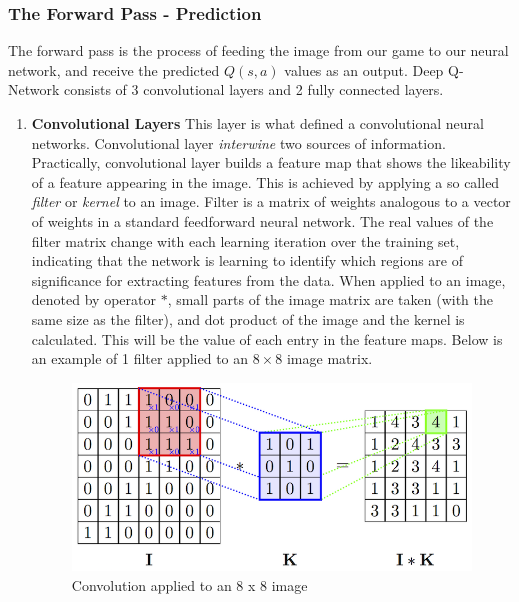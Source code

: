     \subsubsection{The Forward Pass - Prediction}
    The forward pass is the process of feeding the image from our game to our neural network, and receive the predicted $Q(s,a)$ values as an output. Deep Q-Network consists of 3 convolutional layers and 2 fully connected layers. 
    \begin{enumerate}
        \item \textbf{Convolutional Layers}
        This layer is what defined a convolutional neural networks. Convolutional layer \textit{interwine} two sources of information. Practically, convolutional layer builds a feature map that shows the likeability of a feature appearing in the image. This is achieved by applying a so called \textit{filter} or \textit{kernel} to an image. Filter is a matrix of weights analogous to a vector of weights in a standard feedforward neural network. The real values of the filter matrix change with each learning iteration over the training set, indicating that the network is learning to identify which regions are of significance for extracting features from the data. When applied to an image, denoted by operator $*$, small parts of the image matrix are taken (with the same size as the filter), and dot product of the image and the kernel is calculated. This will be the value of each entry in the feature maps. Below is an example of 1 filter applied to an $8 \times 8$ image matrix. 
        \begin{figure}[H]
        \centering
        \includegraphics[scale=1.2]{images/convolve.png}
        \caption{Convolution applied to an 8 x 8 image}
        \label{fig:45}
        \end{figure}


\end{enumerate}
